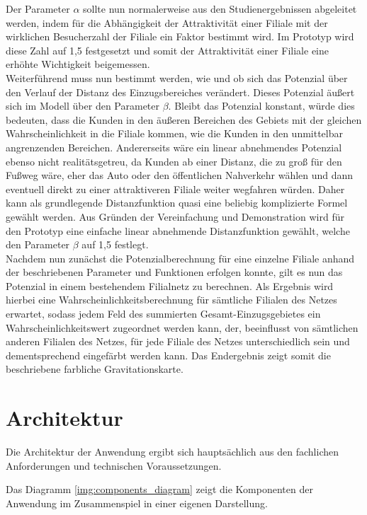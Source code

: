 Der Parameter $\alpha$ sollte nun normalerweise aus den Studienergebnissen abgeleitet werden, indem für die Abhängigkeit der Attraktivität einer Filiale mit der wirklichen Besucherzahl der Filiale ein Faktor bestimmt wird.
Im Prototyp wird diese Zahl auf 1,5 festgesetzt und somit der Attraktivität einer Filiale eine erhöhte Wichtigkeit beigemessen.\\
Weiterführend muss nun bestimmt werden, wie und ob sich das Potenzial über den Verlauf der Distanz des Einzugsbereiches verändert. 
Dieses Potenzial äußert sich im Modell über den Parameter $\beta$.
Bleibt das Potenzial konstant, würde dies bedeuten, dass die Kunden in den äußeren Bereichen des Gebiets mit der gleichen Wahrscheinlichkeit in die Filiale kommen, wie die Kunden in den unmittelbar angrenzenden Bereichen.
Andererseits wäre ein linear abnehmendes Potenzial ebenso nicht realitätsgetreu, da Kunden ab einer Distanz, die zu groß für den Fußweg wäre, eher das Auto oder den öffentlichen Nahverkehr wählen und dann eventuell direkt zu einer attraktiveren Filiale weiter wegfahren würden. 
Daher kann als grundlegende Distanzfunktion quasi eine beliebig komplizierte Formel gewählt werden.
Aus Gründen der Vereinfachung und Demonstration wird für den Prototyp eine einfache linear abnehmende Distanzfunktion gewählt, welche den Parameter $\beta$ auf 1,5 festlegt.\\

Nachdem nun zunächst die Potenzialberechnung für eine einzelne Filiale anhand der beschriebenen Parameter und Funktionen erfolgen konnte, gilt es nun das Potenzial in einem bestehendem Filialnetz zu berechnen.
Als Ergebnis wird hierbei eine Wahrscheinlichkeitsberechnung für sämtliche Filialen des Netzes erwartet, sodass jedem Feld des summierten Gesamt-Einzugsgebietes ein Wahrscheinlichkeitswert zugeordnet werden kann, der, beeinflusst von sämtlichen anderen Filialen des Netzes, für jede Filiale des Netzes unterschiedlich sein und dementsprechend eingefärbt werden kann.
Das Endergebnis zeigt somit die beschriebene farbliche Gravitationskarte.

\section{Architektur}
Die Architektur der Anwendung ergibt sich hauptsächlich aus den fachlichen Anforderungen und technischen Voraussetzungen. 

Das Diagramm \ref{img:components_diagram} zeigt die Komponenten der Anwendung im Zusammenspiel in einer eigenen Darstellung.

